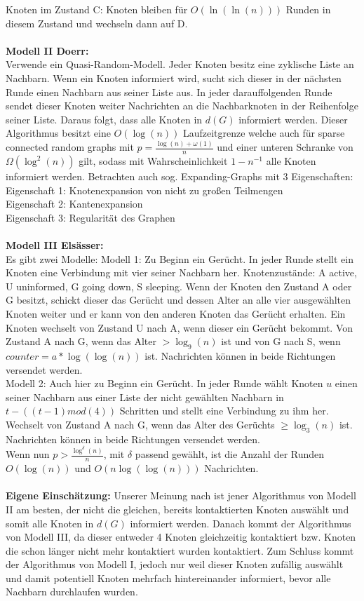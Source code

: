 \documentclass[12pt,a4paper]{report}
\begin{document}
Knoten im Zustand C: Knoten bleiben für $O(\ln(\ln(n)))$ Runden in diesem Zustand und wechseln dann auf D.
\\
\\
\textbf{Modell II Doerr:}\\
Verwende ein Quasi-Random-Modell. Jeder Knoten besitz eine zyklische Liste an Nachbarn. Wenn ein Knoten informiert wird, sucht sich dieser in der nächsten Runde einen Nachbarn aus seiner Liste aus. In jeder darauffolgenden Runde sendet dieser Knoten weiter Nachrichten an die Nachbarknoten in der Reihenfolge seiner Liste. Daraus folgt, dass alle Knoten in $d(G)$ informiert werden. Dieser Algorithmus besitzt eine $O(\log(n))$ Laufzeitgrenze welche auch für sparse connected random graphs mit $p=\frac{\log(n)+\omega(1)}{n}$ und einer unteren Schranke von $\Omega(\log^2(n))$ gilt, sodass mit Wahrscheinlichkeit $1-n^{-1}$ alle Knoten informiert werden. Betrachten auch sog. Expanding-Graphs mit 3 Eigenschaften:\\
Eigenschaft 1: Knotenexpansion von nicht zu großen Teilmengen\\
Eigenschaft 2: Kantenexpansion\\
Eigenschaft 3: Regularität des Graphen
\\
\\
\textbf{Modell III Elsässer:}\\
Es gibt zwei Modelle: Modell 1: Zu Beginn ein Gerücht. In jeder Runde stellt ein Knoten eine Verbindung mit vier seiner Nachbarn her. Knotenzustände: A active, U uninformed, G going down, S sleeping. Wenn der Knoten den Zustand A oder G besitzt, schickt dieser das Gerücht und dessen Alter an alle vier ausgewählten Knoten weiter und er kann von den anderen Knoten das Gerücht erhalten. Ein Knoten wechselt von Zustand U nach A, wenn dieser ein Gerücht bekommt.
Von Zustand A nach G, wenn das Alter $>\log_9(n)$ ist und von G nach S, wenn $counter = a*\log(\log(n))$ ist. Nachrichten können in beide Richtungen versendet werden.\\
Modell 2: Auch hier zu Beginn ein Gerücht. In jeder Runde wählt Knoten $u$ einen seiner Nachbarn aus einer Liste der nicht gewählten Nachbarn in $t-((t-1)mod(4))$ Schritten und stellt eine Verbindung zu ihm her. Wechselt von Zustand A nach G, wenn das Alter des Gerüchts $\ge \log_3(n)$ ist. Nachrichten können in beide Richtungen versendet werden.\\
Wenn nun $p>\frac{\log^{\delta}(n)}{n}$, mit $\delta$ passend gewählt, ist die Anzahl der Runden $O(\log(n))$ und $O(n\log(\log(n)))$ Nachrichten.
\\
\\
\textbf{Eigene Einschätzung:} Unserer Meinung nach ist jener Algorithmus von Modell II am besten, der nicht die gleichen, bereits kontaktierten Knoten auswählt und somit alle Knoten in $d(G)$ informiert werden. Danach kommt der Algorithmus von Modell III, da dieser entweder 4 Knoten gleichzeitig kontaktiert bzw. Knoten die schon länger nicht mehr kontaktiert wurden kontaktiert. Zum Schluss kommt der Algorithmus von Modell I, jedoch nur weil dieser Knoten zufällig auswählt und damit potentiell Knoten mehrfach hintereinander informiert, bevor alle Nachbarn durchlaufen wurden.
\end{document}
